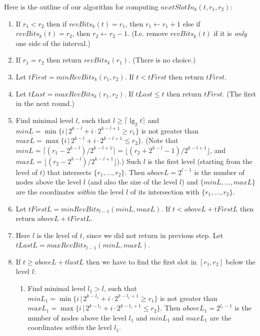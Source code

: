 \documentclass{llncs}
\begin{document}
Here is the outline of our algorithm for computing $nextSlotIn_k(t, r_1,r_2)$:
\begin{enumerate}
\item
If $r_1<r_2$ then 
if $revBits_k(t)=r_1$, then $r_1\gets r_1+1$
else
if $revBits_k(t)=r_2$, then $r_2\gets r_2-1$.
(I.e. remove $revBits_k(t)$ if it is {\em only} one side of the interval.)


\item
If $r_1=r_2$ then return $revBits_k(r_1)$. (There is no choice.)


\item 
Let $tFirst=minRevBits_k(r_1, r_2)$.
If $t<tFirst$ then return $tFirst$.

\item 
Let $tLast=maxRevBits_k(r_1, r_2)$.
If $tLast\le t$ then return $tFirst$. (The first in the next round.)

\item
Find minimal level $l$, such that $l\ge \lceil\lg_2 t\rceil$ and
$minL=\min \{i\,|\, 2^{k-l}+i\cdot 2^{k-l+1}\ge r_1 \}$
is not greater than
$maxL=\max \{i \,|\,   2^{k-l}+i\cdot 2^{k-l+1}\le r_2 \}$.
(Note that
$minL=\lceil (r_1-2^{k-l})/2^{k-l+1}\rceil = \lfloor (r_2+2^{k-l}-1)/2^{k-l+1}\rfloor$,
and $maxL= \lfloor (r_2-2^{k-l})/2^{k-l+1}\rfloor$).)
Such $l$ is the first level (starting from the level of $t$) that
intersects  $\{r_1,\ldots,r_2\}$.
Then
$aboveL=2^{l-1}$ is the number of nodes above the level $l$
(and also the size of the level $l$) and
 $\{minL,\ldots,maxL\}$ 
are the coordinates  {\em within} the level $l$ of its intersection with $\{r_1,\ldots,r_2\}$. 

\item 
Let $tFirstL= minRevBits_{l-1}(minL, maxL)$.
If $t< aboveL+tFirstL$ then return $aboveL+tFirstL$.

\item
Here $l$ is the level of $t$, since we did not return in previous step.
Let $tLastL= maxRevBits_{l-1}(minL, maxL)$.

\item
If $t\ge aboveL+tlastL$ then %
we have to find the first slot in $[r_1,r_2]$ below the level $l$: 
  \begin{enumerate}
  \item
  Find minimal level $l_1>l$, such that 
  $minL_1=\min \{i \,|\, 2^{k-l_1}+i\cdot 2^{k-l_1+1}\ge r_1 \}$
  is not greater than
  $maxL_1=\max \{i \,|\, 2^{k-l_1}+i\cdot 2^{k-l_1+1}\le r_2 \}$.
  Then
  $aboveL_1=2^{l_1-1}$ is the number of nodes above the level $l_1$
  and
  $minL_1$ and $maxL_1$ 
  are the coordinates {\em within} the level $l_1$. 


\end{enumerate}
\end{enumerate}
\end{document}
